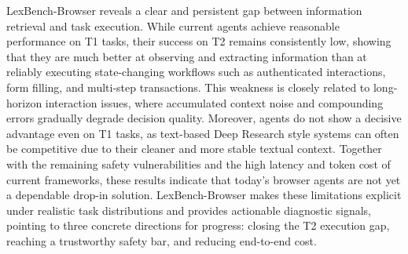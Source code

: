 LexBench-Browser reveals a clear and persistent gap between information retrieval and task execution. While current agents achieve reasonable performance on T1 tasks, their success on T2 remains consistently low, showing that they are much better at observing and extracting information than at reliably executing state-changing workflows such as authenticated interactions, form filling, and multi-step transactions. This weakness is closely related to long-horizon interaction issues, where accumulated context noise and compounding errors gradually degrade decision quality. Moreover, agents do not show a decisive advantage even on T1 tasks, as text-based Deep Research style systems can often be competitive due to their cleaner and more stable textual context. Together with the remaining safety vulnerabilities and the high latency and token cost of current frameworks, these results indicate that today’s browser agents are not yet a dependable drop-in solution. LexBench-Browser makes these limitations explicit under realistic task distributions and provides actionable diagnostic signals, pointing to three concrete directions for progress: closing the T2 execution gap, reaching a trustworthy safety bar, and reducing end-to-end cost.